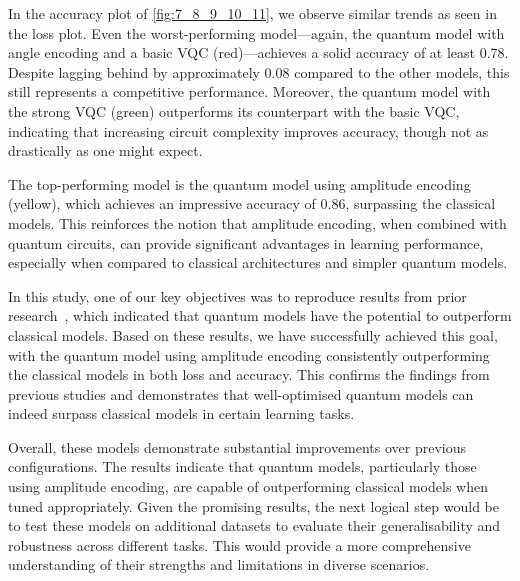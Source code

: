 In the accuracy plot of \autoref{fig:7_8_9_10_11}, we observe similar
trends as seen in the loss plot. Even the worst-performing
model—again, the quantum model with angle encoding and a basic \gls{VQC}
(red)—achieves a solid accuracy of at least 0.78. Despite lagging
behind by approximately 0.08 compared to the other models, this still
represents a competitive performance. Moreover, the quantum model
with the strong \gls{VQC} (green) outperforms its counterpart with the
basic \gls{VQC}, indicating that increasing circuit complexity improves
accuracy, though not as drastically as one might expect.

The top-performing model is the quantum model using amplitude
encoding (yellow), which achieves an impressive accuracy of 0.86,
surpassing the classical models. This reinforces the notion that
amplitude encoding, when combined with quantum circuits, can provide
significant advantages in learning performance, especially when
compared to classical architectures and simpler quantum models.

In this study, one of our key objectives was to reproduce results
from prior research~\cite{Cherrat_2024}, which indicated that quantum
models have the
potential to outperform classical models. Based on these results, we
have successfully achieved this goal, with the quantum model using
amplitude encoding consistently outperforming the classical models in
both loss and accuracy. This confirms the findings from previous
studies and demonstrates that well-optimised quantum models can
indeed surpass classical models in certain learning tasks.

Overall, these models demonstrate substantial improvements over
previous configurations. The results indicate that quantum models,
particularly those using amplitude encoding, are capable of
outperforming classical models when tuned appropriately. Given the
promising results, the next logical step would be to test these
models on additional datasets to evaluate their generalisability and
robustness across different tasks. This would provide a more
comprehensive understanding of their strengths and limitations in
diverse scenarios.

